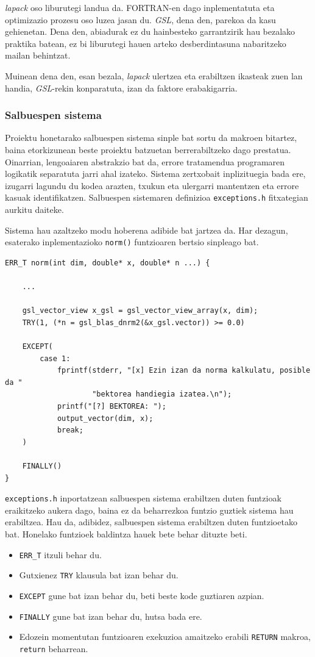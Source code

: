 \documentclass[10pt,a4paper,basque]{article}
\begin{document}
\emph{lapack} oso liburutegi landua da. FORTRAN-en dago inplementatuta eta optimizazio prozesu oso luzea jasan du. \emph{GSL}, dena den, parekoa da kasu gehienetan. Dena den, abiadurak ez du hainbesteko garrantzirik hau bezalako praktika batean, ez bi liburutegi hauen arteko desberdintasuna nabaritzeko mailan behintzat.

Muinean dena den, esan bezala, \emph{lapack} ulertzea eta erabiltzen ikasteak zuen lan handia, \emph{GSL}-rekin konparatuta, izan da faktore erabakigarria.

\subsubsection{Salbuespen sistema}

Proiektu honetarako salbuespen sistema sinple bat sortu da makroen bitartez, baina etorkizunean beste proiektu batzuetan berrerabiltzeko dago prestatua. Oinarrian, lengoaiaren abstrakzio bat da, errore tratamendua programaren logikatik separatuta jarri ahal izateko. Sistema zertxobait inplizituegia bada ere, izugarri lagundu du kodea arazten, txukun eta ulergarri mantentzen eta errore kasuak identifikatzen. Salbuespen sistemaren definizioa \verb|exceptions.h| fitxategian aurkitu daiteke.

Sistema hau azaltzeko modu hoberena adibide bat jartzea da. Har dezagun, esaterako inplementazioko \verb|norm()| funtzioaren bertsio sinpleago bat.

\begin{lstlisting}
ERR_T norm(int dim, double* x, double* n ...) {
	
	...	
	
	gsl_vector_view x_gsl = gsl_vector_view_array(x, dim);
	TRY(1, (*n = gsl_blas_dnrm2(&x_gsl.vector)) >= 0.0)

	EXCEPT(
		case 1:
			fprintf(stderr, "[x] Ezin izan da norma kalkulatu, posible da "
					"bektorea handiegia izatea.\n");
			printf("[?] BEKTOREA: ");
			output_vector(dim, x);
			break;
	)

	FINALLY()
}
\end{lstlisting}

\verb|exceptions.h| inportatzean salbuespen sistema erabiltzen duten funtzioak eraikitzeko aukera dago, baina ez da beharrezkoa funtzio guztiek sistema hau erabiltzea. Hau da, adibidez, salbuespen sistema erabiltzen duten funtzioetako bat. Honelako funtzioek baldintza hauek bete behar dituzte beti.

\begin{itemize}
\item \verb|ERR_T| itzuli behar du.
\item Gutxienez \verb|TRY| klausula bat izan behar du.
\item \verb|EXCEPT| gune bat izan behar du, beti beste kode guztiaren azpian.
\item \verb|FINALLY| gune bat izan behar du, hutsa bada ere.
\item Edozein momentutan funtzioaren exekuzioa amaitzeko erabili \verb|RETURN| makroa, \verb|return| beharrean.
\end{itemize}
\end{document}
